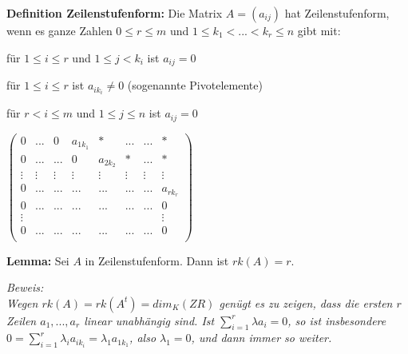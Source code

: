\documentclass[11pt]{article}
\begin{document}
		\begin{mdframed}[backgroundcolor=blue!20]
			\textbf{Definition Zeilenstufenform:} Die Matrix $A=(a_{ij})$ hat Zeilenstufenform, wenn es ganze Zahlen $0\le r \le m$ und $1\le 
			k_1<...<k_r\le n$ gibt mit:
			\begin{compactitem}
				\item für $1\le i \le r$ und $1\le j < k_i$ ist $a_{ij}=0$
				\item für $1\le i \le r$ ist $a_{ik_{i}}\neq 0$ (sogenannte Pivotelemente)
				\item für $r<i\le m$ und $1\le j\le n$ ist $a_{ij}=0$
			\end{compactitem}
			\begin{center}
				$\begin{pmatrix}
					0 & ... & 0 & a_{1k_{1}} & * & ... & ... & *\\
					0 & ... & ... & 0 & a_{2k_{2}} & * & ... & *\\
					\vdots & \vdots & \vdots & \vdots & \vdots & \vdots & \vdots & \vdots\\
					0 & ... & ... & ... & ... & ... & ... & a_{rk_{r}}\\
					0 & ... & ... & ... & ... & ... & ... & 0\\
					\vdots & \; & \; & \; & \; & \; & \; & \vdots\\
					0 & ... & ... & ... & ... & ... & ... & 0\\
				\end{pmatrix}$
			\end{center}
		\end{mdframed}
		
		\begin{framed}
			\textbf{Lemma:} Sei $A$ in Zeilenstufenform. Dann ist $rk(A)=r$.
		\end{framed}
		\textit{Beweis: \\
		Wegen $rk(A)=rk(A^t)=dim_K(ZR)$ genügt es zu zeigen, dass die ersten $r$ Zeilen $a_1,...,a_r$ linear unabhängig sind. Ist $\sum
		\limits_{i=1}^r \lambda a_i=0$, so ist insbesondere $0=\sum\limits_{i=1}^r \lambda_i a_{ik_{i}}=\lambda_1 a_{1k_{1}}$, also $\lambda_1
		=0$, und dann immer so weiter.}
		
\end{document}
